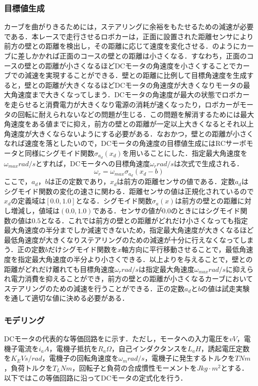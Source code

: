 \subsubsection{目標値生成}
カーブを曲がりきるためには，ステアリングに余裕をもたせるための減速が必要である．本レースで走行させるロボカーは，正面に設置された距離センサにより前方の壁との距離を検出し，その距離に応じて速度を変化させる．のようにカーブに差しかかれば正面のコースの壁との距離は小さくなる．すなわち，正面のコースの壁との距離が小さくなるほどDCモータの角速度を小さくすることでカーブでの減速を実現することができる．壁との距離に比例して目標角速度を生成すると，壁との距離が大きくなるほどDCモータの角速度が大きくなりモータの最大角速度まで大きくなってしまう．DCモータの角速度が最大の状態でロボカーを走らせると消費電力が大きくなり電源の消耗が速くなったり，ロボカーがモータの回転に耐えられないなどの問題が生じる．この問題を解消するためには最大角速度をある値までに抑え，前方の壁との距離が一定以上大きくなるとそれ以上角速度が大きくならないようにする必要がある．なおかつ，壁との距離が小さくなれば速度を落としたいので，DCモータの角速度の目標値生成にはRCサーボモータと同様にシグモイド関数$\sigma_{a_{d}}(x_{d})$を用いることにした．指定最大角速度を$\omega_{max}\unit{rad/s} $とすれば，DCモータへの目標角速度$\omega_{r}\unit{rad/s}$は次式で生成される．
\begin{equation}
 \omega_{r}=\omega_{max}\sigma_{a_{d}}(x_{d}-b)\label{eq::omega_r}
\end{equation}
ここで，$a_{d}$，$b$は正の定数であり，$x_{d}$は前方の距離センサの値である．定数$a_{d}$はシグモイド関数の変化の速さに関わる．距離センサの値は正規化されているので$x_{d}$の定義域は$[0.0,1.0]$となる．シグモイド関数$\sigma_{a}(x)$は前方の壁との距離に対し増減し，値域は$(0.0,1.0)$である．センサの値が$0.0$のときにはシグモイド関数の値は$0.5$となる．これでは前方の壁との距離がどれだけ小さくなっても指定最大角速度の半分までしか減速できないため，指定最大角速度が大きくなるほど最低角速度が大きくなりステアリングのための減速が十分に行えなくなってしまう．正の定数$b$だけシグモイド関数を$x$軸方向に平行移動させることで，最低角速度を指定最大角速度の半分より小さくできる．以上よりを与えることで，壁との距離がどれだけ離れても目標角速度$\omega_{r}\unit{rad/s}$は指定最大角速度$\omega_{max}\unit{rad/s}$に抑えられ電力消費を抑えることができ，前方の壁との距離が小さくなるカーブにおいてステアリングのための減速を行うことができる．正の定数$a_{d}$と$b$の値は試走実験を通して適切な値に決める必要がある．

\subsubsection{モデリング}
DCモータの代表的な等価回路をに示す．\cite{dcmmodeling}ただし，モータへの入力電圧を$v\unit{V}$，電機子電流を$i_{a}\unit{A}$，電機子抵抗を$R_{a}\unit{\Omega}$，自己インダクタンスを$L_{a}\unit{H}$，誘起電圧定数を$K_{E}\unit{Vs/rad}$，電機子の回転角速度を$\omega_{m}\unit{rad/s}$，電機子に発生するトルクを$T\unit{Nm}$，負荷トルクを$T_L\unit{Nm}$，回転子と負荷の合成慣性モーメントを$J\unit{kg\cdot m^2}$とする．以下ではこの等価回路に沿ってDCモータの定式化を行う．

